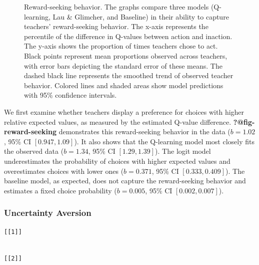 \documentclass[
  number,
  preprint,
  3p,
  onecolumn]{elsarticle}
\begin{document}
\begin{figure}


\caption{\label{fig-reward-seeking-2}Reward-seeking behavior. The graphs
compare three models (Q-learning, Lau \& Glimcher, and Baseline) in
their ability to capture teachers' reward-seeking behavior. The x-axis
represents the percentile of the difference in Q-values between action
and inaction. The y-axis shows the proportion of times teachers chose to
act. Black points represent mean proportions observed across teachers,
with error bars depicting the standard error of these means. The dashed
black line represents the smoothed trend of observed teacher behavior.
Colored lines and shaded areas show model predictions with 95\%
confidence intervals.}

\end{figure}%

We first examine whether teachers display a preference for choices with
higher relative expected values, as measured by the estimated Q-value
difference. \textbf{?@fig-reward-seeking} demonstrates this
reward-seeking behavior in the data (\(b = 1.02\), 95\% CI
\([0.947, 1.09]\)). It also shows that the Q-learning model most closely
fits the observed data (\(b = 1.34\), 95\% CI \([1.29, 1.39]\)). The
logit model underestimates the probability of choices with higher
expected values and overestimates choices with lower ones
(\(b = 0.371\), 95\% CI \([0.333,0.409]\)). The baseline model, as
expected, does not capture the reward-seeking behavior and estimates a
fixed choice probability (\(b = 0.005\), 95\% CI \([0.002,0.007]\)).

\subsubsection{Uncertainty Aversion}\label{uncertainty-aversion}

\begin{verbatim}
[[1]]
\end{verbatim}

\begin{verbatim}

[[2]]
\end{verbatim}
\end{document}
